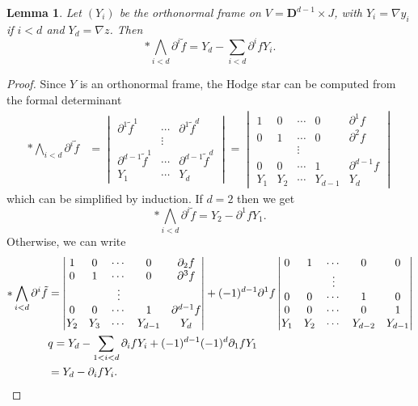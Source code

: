 \documentclass[reqno,12pt,letterpaper]{amsart}
\newcommand{\DD}{\mathbf{D}}
\newtheorem{lemma}[theorem]{Lemma}
\theoremstyle{definition}
\numberwithin{equation}{section}
\begin{document}
\begin{lemma}
Let $(Y_i)$ be the orthonormal frame on $V = \DD^{d - 1} \times J$, with $Y_i = \nabla y_i$ if $i < d$ and $Y_d = \nabla z$.
Then
$$*\bigwedge_{i<d} \partial^i \tilde f = Y_d - \sum_{i<d} \partial^i fY_i.$$
\end{lemma}
\begin{proof}
Since $Y$ is an orthonormal frame, the Hodge star can be computed from the formal determinant
\begin{align*}
*\bigwedge_{i < d} \partial^i \tilde f &=
\begin{vmatrix} \partial^1 \tilde f^1 & \cdots & \partial^1 \tilde f^d \\
& \vdots \\
\partial^{d - 1} \tilde f^1 & \cdots & \partial^{d - 1} \tilde f^d \\
Y_1 & \cdots & Y_d
\end{vmatrix} = \begin{vmatrix} 1 & 0 & \cdots & 0 & \partial^1 f \\
0 & 1 & \cdots & 0 & \partial^2 f \\
& & \vdots \\
0 & 0 & \cdots & 1 & \partial^{d - 1} f \\
Y_1 & Y_2 & \cdots & Y_{d - 1} & Y_d
\end{vmatrix}
\end{align*}
which can be simplified by induction. If $d = 2$ then we get
$$*\bigwedge_{i < d} \partial^i \tilde f = Y_2 - \partial^1 f Y_1.$$
Otherwise, we can write
\begin{align*}
*\bigwedge_{i < d} \partial^i \tilde f &= \begin{vmatrix}  1 & 0 & \cdots & 0 & \partial_2 f \\
0 & 1 & \cdots & 0 & \partial^3 f \\
& & \vdots \\
0 & 0 & \cdots & 1 & \partial^{d - 1} f \\
Y_2 & Y_3 & \cdots & Y_{d - 1} & Y_d
\end{vmatrix} + (-1)^{d - 1} \partial^1 f
\begin{vmatrix}
0 & 1 & \cdots & 0 & 0 \\
& & \vdots \\
0 & 0 & \cdots & 1 & 0 \\
0 & 0 & \cdots & 0 & 1 \\
Y_1 & Y_2 & \cdots & Y_{d - 2} & Y_{d - 1}
\end{vmatrix}\\
& q= Y_d - \sum_{1 < i < d} \partial_if Y_i + (-1)^{d - 1} (-1)^d \partial_1 f Y_1 \\
&= Y_d - \partial_if Y_i. \qedhere
\end{align*}
\end{proof}
\end{document}
